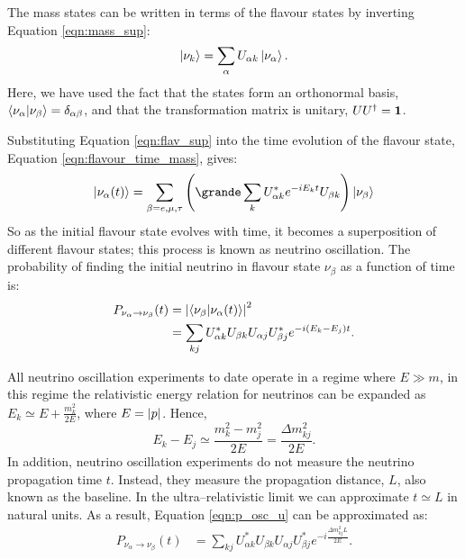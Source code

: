 The mass states can be written in terms of the flavour states by inverting
Equation \ref{eqn:mass_sup}:
\begin{equation}
	\label{eqn:flav_sup}
	\ket{\nu_k} = \sum_\alpha U_{\alpha k} \ket{\nu_\alpha}.
\end{equation}
Here, we have used the fact that the states form an orthonormal basis,
\(\braket{\nu_\alpha}{\nu_\beta} = \delta_{\alpha \beta}\), and that the 
transformation matrix is unitary, \(UU^\dagger = \vb{1}\).

Substituting Equation \ref{eqn:flav_sup} into the time evolution of the flavour
state, Equation \ref{eqn:flavour_time_mass}, gives:
\begin{equation}
	\label{eqn:flavour_time_flav}
	\ket{\nu_\alpha(t)} = \sum_{\beta = e, \mu, \tau} \qty(\grande \sum_k
	U^*_{\alpha k} e^{-iE_kt} U_{\beta k})\ket{\nu_\beta} 
\end{equation}
So as the initial flavour state evolves with time, it becomes a superposition 
of different flavour states; this process is known as neutrino oscillation.
The probability of finding the initial neutrino in flavour state \(\nu_\beta\) 
as a function of time is:
\begin{align}
	\label{eqn:p_osc_u}
	P_{\nu_\alpha \rightarrow \nu_\beta}(t) &= \abs{\braket{\nu_\beta}{\nu_\alpha(t)}}^2 \\
	                               &= \sum_{kj} U^*_{\alpha k} U_{\beta k} U_{\alpha j} U^*_{\beta j} e^{-i(E_k - E_j)t}.
\end{align}

All neutrino oscillation experiments to date operate in a regime where 
\(E \gg m\), in this regime the relativistic energy relation for neutrinos can 
be expanded as \({E_k \simeq E + \frac{m_k^2}{2E}}\), where \(E = \abs{p}\). 
Hence, 
\begin{equation}
	\label{eqn:energy_diff}
	E_k - E_j \simeq \frac{m_k^2 - m_j^2}{2E} = \frac{\Delta m_{kj}^2}{2E}.
\end{equation}
In addition, neutrino oscillation experiments do not measure the neutrino
propagation time \(t\). Instead, they measure the propagation distance, \(L\), 
also known as the baseline. In the ultra--relativistic limit we can approximate 
\({t \simeq L}\) in natural units. As a result, Equation \ref{eqn:p_osc_u} can be
approximated as:
\begin{align}
	\label{eqn:p_osc_u_l}
	P_{\nu_\alpha \rightarrow \nu_\beta}(t) &= \sum_{kj} U^*_{\alpha k} U_{\beta k} U_{\alpha j} U^*_{\beta j} e^{-i\frac{\Delta m^2_{kj}L}{2E}}.
\end{align}

